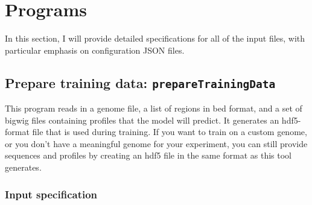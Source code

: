 \documentclass{article}
\begin{document}
\section{Programs}

In this section, I will provide detailed specifications for all of the input
files, with particular emphasis on configuration JSON files.

\newpage
\subsection{Prepare training data: \texttt{prepareTrainingData}}\label{prog:prepareTrainingData}

This program reads in a genome file, a list of regions in bed format, and a set
of bigwig files containing profiles that the model will predict.
It generates an hdf5-format file that is used during training.
If you want to train on a custom genome, or you don't have a meaningful genome
for your experiment, you can still provide sequences and profiles by creating
an hdf5 file in the same format as this tool generates.

\subsubsection{Input specification}


\end{document}
